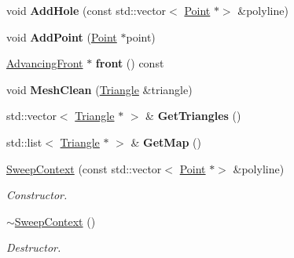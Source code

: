 \begin{DoxyCompactItemize}
\item 
\mbox{\label{classp2t_1_1SweepContext_a109ad5394add88882d3d547cb2f25b95}} 
void {\bfseries Add\+Hole} (const std\+::vector$<$ \hyperlink{structp2t_1_1Point}{Point} $\ast$$>$ \&polyline)
\item 
\mbox{\label{classp2t_1_1SweepContext_a1197bffb2102eef7615a143ee5ce0437}} 
void {\bfseries Add\+Point} (\hyperlink{structp2t_1_1Point}{Point} $\ast$point)
\item 
\mbox{\label{classp2t_1_1SweepContext_a96c74c5c56fc875ab90edb5c4bec0ee2}} 
\hyperlink{classp2t_1_1AdvancingFront}{Advancing\+Front} $\ast$ {\bfseries front} () const
\item 
\mbox{\label{classp2t_1_1SweepContext_a37a0e33f03be651567ae13cd65c25161}} 
void {\bfseries Mesh\+Clean} (\hyperlink{classp2t_1_1Triangle}{Triangle} \&triangle)
\item 
\mbox{\label{classp2t_1_1SweepContext_aa1edb4e619dc44110d3aa0c71840fe21}} 
std\+::vector$<$ \hyperlink{classp2t_1_1Triangle}{Triangle} $\ast$ $>$ \& {\bfseries Get\+Triangles} ()
\item 
\mbox{\label{classp2t_1_1SweepContext_ab954404d08be7fb3b6c4cfb643befcfb}} 
std\+::list$<$ \hyperlink{classp2t_1_1Triangle}{Triangle} $\ast$ $>$ \& {\bfseries Get\+Map} ()
\item 
\mbox{\label{classp2t_1_1SweepContext_a0e9d5ab3f563e9411c57a81d6f5fa784}} 
\hyperlink{classp2t_1_1SweepContext_a0e9d5ab3f563e9411c57a81d6f5fa784}{Sweep\+Context} (const std\+::vector$<$ \hyperlink{structp2t_1_1Point}{Point} $\ast$$>$ \&polyline)
\begin{DoxyCompactList}\small\item\em Constructor. \end{DoxyCompactList}\item 
\mbox{\label{classp2t_1_1SweepContext_a4275f1eb166fe4c69d18670898c65f98}} 
\hyperlink{classp2t_1_1SweepContext_a4275f1eb166fe4c69d18670898c65f98}{$\sim$\+Sweep\+Context} ()
\begin{DoxyCompactList}\small\item\em Destructor. \end{DoxyCompactList}\item 

\end{DoxyCompactItemize}

